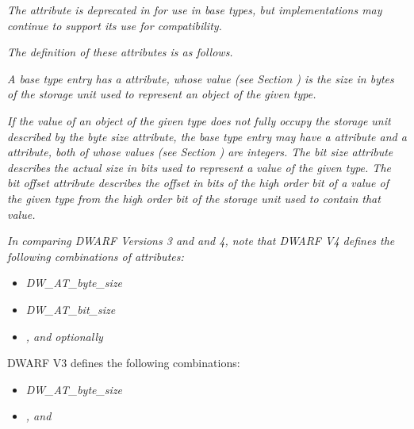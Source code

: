 \textit{The attribute  is 
deprecated in 
for use in base types, but implementations may continue to
support its use for compatibility.}

\textit{The 
definition of these attributes is as follows.}

\begin{myindentpara}{1cm}
\textit{A base type entry has a 
attribute, whose value
(see Section )
is the size in bytes of the storage unit
used to represent an object of the given type.}

\textit{If the value of an object of the given type does not fully
occupy the storage unit described by the byte size attribute,
the base type entry may have a 
 attribute 
and a
 attribute, both of whose values 
(see Section ) 
are integers. The bit size attribute describes the actual
size in bits used to represent a value of the given type.
The bit offset attribute describes the offset in bits of the
high order bit of a value of the given type from the high
order bit of the storage unit used to contain that value.}
\end{myindentpara}

\textit{In comparing 
DWARF Versions 3 
and 
 and 
4, note that DWARF V4
defines the following combinations of attributes:}

\begin{itemize}
\item \textit{DW\-\_AT\-\_byte\-\_size}
\item \textit{DW\-\_AT\-\_bit\-\_size}
\item \textit{,
and optionally }
\end{itemize}
DWARF V3 
defines the following combinations:
\begin{itemize}
\item \textit{DW\-\_AT\-\_byte\-\_size}
\item \textit{, 
 and 
}
\end{itemize}

